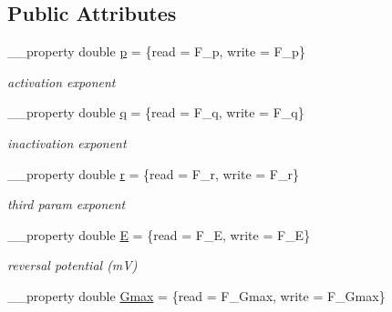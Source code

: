 \subsection*{Public Attributes}
\begin{DoxyCompactItemize}
\item 
\hypertarget{class_t_h_h_current_aa73d944f399e4c9c35d593a90cae5c69}{\+\_\+\+\_\+property double \hyperlink{class_t_h_h_current_aa73d944f399e4c9c35d593a90cae5c69}{p} = \{read = F\+\_\+p, write = F\+\_\+p\}}\label{class_t_h_h_current_aa73d944f399e4c9c35d593a90cae5c69}

\begin{DoxyCompactList}\small\item\em activation exponent \end{DoxyCompactList}\item 
\hypertarget{class_t_h_h_current_a0b37f38ef5846ae777ae355c4ff9fd58}{\+\_\+\+\_\+property double \hyperlink{class_t_h_h_current_a0b37f38ef5846ae777ae355c4ff9fd58}{q} = \{read = F\+\_\+q, write = F\+\_\+q\}}\label{class_t_h_h_current_a0b37f38ef5846ae777ae355c4ff9fd58}

\begin{DoxyCompactList}\small\item\em inactivation exponent \end{DoxyCompactList}\item 
\hypertarget{class_t_h_h_current_aeb92787a6cc1f7704db0731810f2b3ec}{\+\_\+\+\_\+property double \hyperlink{class_t_h_h_current_aeb92787a6cc1f7704db0731810f2b3ec}{r} = \{read = F\+\_\+r, write = F\+\_\+r\}}\label{class_t_h_h_current_aeb92787a6cc1f7704db0731810f2b3ec}

\begin{DoxyCompactList}\small\item\em third param exponent \end{DoxyCompactList}\item 
\hypertarget{class_t_h_h_current_a1396d7860bf5838e11577389ff9dcd09}{\+\_\+\+\_\+property double \hyperlink{class_t_h_h_current_a1396d7860bf5838e11577389ff9dcd09}{E} = \{read = F\+\_\+\+E, write = F\+\_\+\+E\}}\label{class_t_h_h_current_a1396d7860bf5838e11577389ff9dcd09}

\begin{DoxyCompactList}\small\item\em reversal potential (m\+V) \end{DoxyCompactList}\item 
\hypertarget{class_t_h_h_current_a78154399d225a791f4dfd93546de6903}{\+\_\+\+\_\+property double \hyperlink{class_t_h_h_current_a78154399d225a791f4dfd93546de6903}{Gmax} = \{read = F\+\_\+\+Gmax, write = F\+\_\+\+Gmax\}}\label{class_t_h_h_current_a78154399d225a791f4dfd93546de6903}


\end{DoxyCompactItemize}
